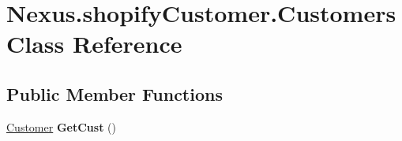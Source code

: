 \hypertarget{class_nexus_1_1shopify_customer_1_1_customers}{}\section{Nexus.\+shopify\+Customer.\+Customers Class Reference}
\label{class_nexus_1_1shopify_customer_1_1_customers}
\subsection*{Public Member Functions}
\begin{DoxyCompactItemize}
\item 
\mbox{\label{class_nexus_1_1shopify_customer_1_1_customers_aaa4657c61b413006cfa4eb5257d5778d}} 
\mbox{\hyperlink{class_nexus_1_1_customer}{Customer}} {\bfseries Get\+Cust} ()
\end{DoxyCompactItemize}
